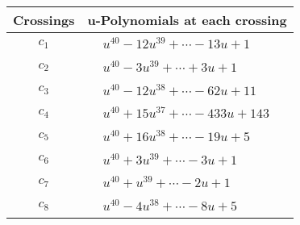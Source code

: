 \documentclass[1p]{elsarticle_modified}
\theoremstyle{definition}
\begin{document}
\begin{tabular}{m{50pt}|m{274pt}}
Crossings & \hspace{64pt}u-Polynomials at each crossing \\
\hline $$\begin{aligned}c_{1}\end{aligned}$$&$\begin{aligned}
&u^{40}-12 u^{39}+\cdots-13 u+1
\end{aligned}$\\
\hline $$\begin{aligned}c_{2}\end{aligned}$$&$\begin{aligned}
&u^{40}-3 u^{39}+\cdots+3 u+1
\end{aligned}$\\
\hline $$\begin{aligned}c_{3}\end{aligned}$$&$\begin{aligned}
&u^{40}-12 u^{38}+\cdots-62 u+11
\end{aligned}$\\
\hline $$\begin{aligned}c_{4}\end{aligned}$$&$\begin{aligned}
&u^{40}+15 u^{37}+\cdots-433 u+143
\end{aligned}$\\
\hline $$\begin{aligned}c_{5}\end{aligned}$$&$\begin{aligned}
&u^{40}+16 u^{38}+\cdots-19 u+5
\end{aligned}$\\
\hline $$\begin{aligned}c_{6}\end{aligned}$$&$\begin{aligned}
&u^{40}+3 u^{39}+\cdots-3 u+1
\end{aligned}$\\
\hline $$\begin{aligned}c_{7}\end{aligned}$$&$\begin{aligned}
&u^{40}+u^{39}+\cdots-2 u+1
\end{aligned}$\\
\hline $$\begin{aligned}c_{8}\end{aligned}$$&$\begin{aligned}
&u^{40}-4 u^{38}+\cdots-8 u+5
\end{aligned}$\\

\end{tabular}
\end{document}
